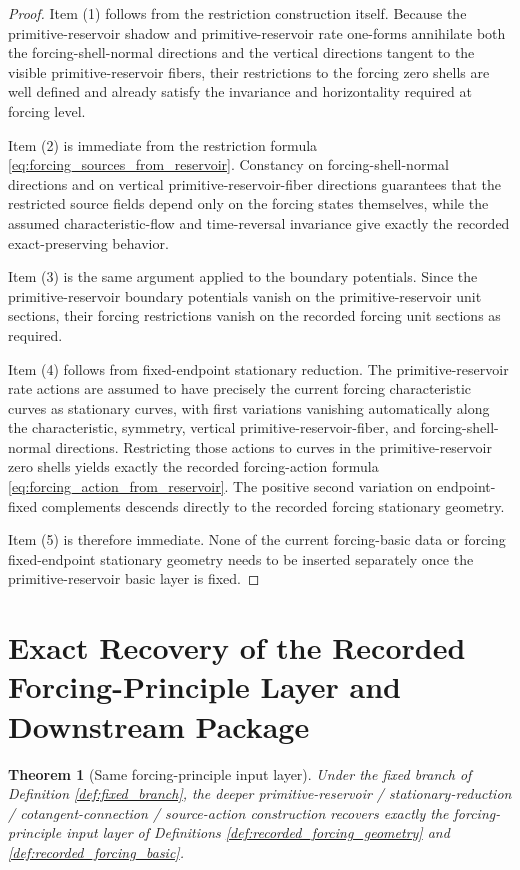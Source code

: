 \documentclass[11pt]{article}
\newtheorem{theorem}{Theorem}
\begin{document}
\begin{proof}
Item (1) follows from the restriction construction itself. Because the primitive-reservoir shadow and primitive-reservoir rate one-forms annihilate both the forcing-shell-normal directions and the vertical directions tangent to the visible primitive-reservoir fibers, their restrictions to the forcing zero shells are well defined and already satisfy the invariance and horizontality required at forcing level.

Item (2) is immediate from the restriction formula \eqref{eq:forcing_sources_from_reservoir}. Constancy on forcing-shell-normal directions and on vertical primitive-reservoir-fiber directions guarantees that the restricted source fields depend only on the forcing states themselves, while the assumed characteristic-flow and time-reversal invariance give exactly the recorded exact-preserving behavior.

Item (3) is the same argument applied to the boundary potentials. Since the primitive-reservoir boundary potentials vanish on the primitive-reservoir unit sections, their forcing restrictions vanish on the recorded forcing unit sections as required.

Item (4) follows from fixed-endpoint stationary reduction. The primitive-reservoir rate actions are assumed to have precisely the current forcing characteristic curves as stationary curves, with first variations vanishing automatically along the characteristic, symmetry, vertical primitive-reservoir-fiber, and forcing-shell-normal directions. Restricting those actions to curves in the primitive-reservoir zero shells yields exactly the recorded forcing-action formula \eqref{eq:forcing_action_from_reservoir}. The positive second variation on endpoint-fixed complements descends directly to the recorded forcing stationary geometry.

Item (5) is therefore immediate. None of the current forcing-basic data or forcing fixed-endpoint stationary geometry needs to be inserted separately once the primitive-reservoir basic layer is fixed.
\end{proof}

\section{Exact Recovery of the Recorded Forcing-Principle Layer and Downstream Package}

\begin{theorem}[Same forcing-principle input layer]
\label{thm:same_forcing_input}
Under the fixed branch of Definition \ref{def:fixed_branch}, the deeper primitive-reservoir / stationary-reduction / cotangent-connection / source-action construction recovers exactly the forcing-principle input layer of Definitions \ref{def:recorded_forcing_geometry} and \ref{def:recorded_forcing_basic}.
\end{theorem}
\end{document}

